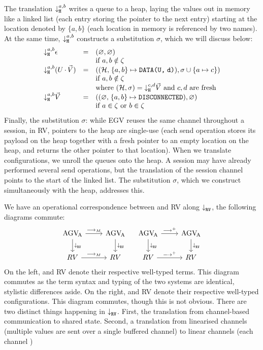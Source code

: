 \documentclass[sigplan,review,anonymous]{acmart}
\begin{document}
The translation $\mtrh[a,b]{}$ writes a queue to a heap, laying the values out in memory like a linked list (each entry storing the pointer to the next entry) starting at the location denoted by $\{a,b\}$ (each location in memory is referenced by two names). At the same time, $\mtrh[a,b]{}$ constructs a substitution $\sigma$, which we will discuss below:
\[
  \begin{array}{lcl}
    \mtrh[a,b]{\gvVecEmp}
    & = & (\rvHeapEmp, \varnothing)
    \\ && \text{if }\tm{a},\tm{b}\notin\zeta
    \\
    \mtrh[a,b]{\parens{\tm{U}\gvVecAdd\gvVec{V}}}
    & = & ((\rvHeapData{\rvHeap{H}}{a}{b}{\rvMemData{U}{d}}), \sigma \cup \{\tm{a}\mapsto\tm{c}\})
    \\ && \text{if }\tm{a},\tm{b}\notin\zeta
    \\ && \text{where }(\rvHeap{H}, \sigma) = \mtrh[c,d]{\gvVec{V}}
          \text{ and }\tm{c},\tm{d}\text{ are fresh}
    \\
    \mtrh[a,b]{\gvVec{V}}
    & = & ((\rvHeapDisc{\rvHeapEmp}{a}{b}), \varnothing)
    \\ && \text{if }\tm{a}\in\zeta\text{ or }\tm{b}\in\zeta
  \end{array}
\]
Finally, the substitution $\sigma$: while EGV reuses the same channel throughout a session, in RV, pointers to the heap are single-use (each send operation stores its payload on the heap together with a fresh pointer to an empty location on the heap, and returns the other pointer to that location). 
When we translate configurations, we unroll the queues onto the heap. A session may have already performed several send operations, but the translation of the session channel points to the start of the linked list. The substitution $\sigma$, which we construct simultaneously with the heap, addresses this.

We have an operational correspondence between \affineAGV and RV along $\mtr{}$, \ie the following diagrams commute:
\[
  \begin{tikzcd}
    \affineAGV
    \rar{\gvRedArrPure}
    \dar{\mtr{}}
    &
    \affineAGV
    \dar{\mtr{}}
    \\
    RV
    \rar{\gvRedArrPure}
    &
    RV
  \end{tikzcd}
  \quad
  \begin{tikzcd}
    \affineAGV
    \rar{\gvRedArr^{+}}
    \dar{\mtr{}}
    &
    \affineAGV
    \dar{\mtr{}}
    \\
    RV
    \rar{\gvRedArr^{+}}
    &
    RV
  \end{tikzcd}
\]
On the left, \affineAGV and RV denote their respective well-typed terms. This diagram commutes as the term syntax and typing of the two systems are identical, stylistic differences aside.
On the right, \affineAGV and RV denote their respective well-typed configurations. This diagram commutes, though this is not obvious.
There are two distinct things happening in $\mtr{}$. First, the translation from channel-based communication to shared state. Second, a translation from linearised channels (multiple values are sent over a single buffered channel) to linear channels (each channel )





\end{document}
